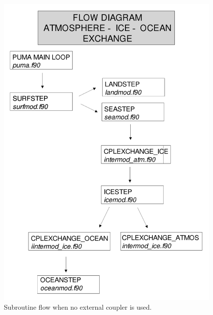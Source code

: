 \begin{figure}[p]
\vspace{-2cm}
\includegraphics[width={14cm}]{Pics/modules_icemod_pumaflow}
\caption[]{Subroutine flow when no external coupler is used.}
\label{pumaflowfig}
\end{figure}



